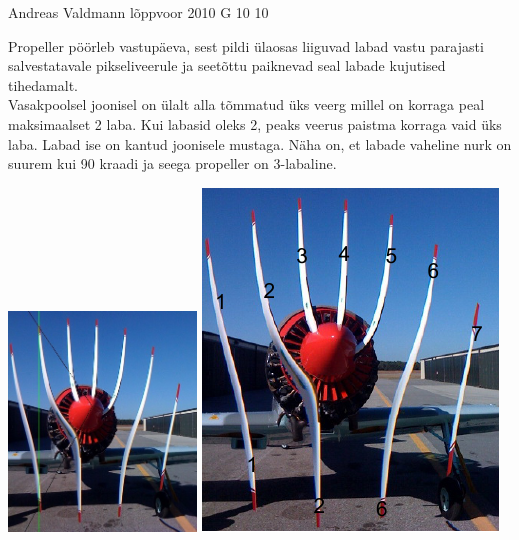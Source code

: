 \documentclass[11pt]{article}
\begin{document}
{%
{Andreas Valdmann} %
{lõppvoor} %
{2010} %
{G 10} %
{10} %
{

\ifSolution
\osa Propeller pöörleb vastupäeva, sest pildi ülaosas liiguvad labad vastu parajasti salvestatavale pikseliveerule ja seetõttu paiknevad seal labade kujutised tihedamalt.\\
\osa Vasakpoolsel joonisel on ülalt alla tõmmatud üks veerg millel on korraga peal maksimaalset 2 laba. Kui labasid oleks 2, peaks veerus paistma korraga vaid üks laba. Labad ise on kantud joonisele mustaga. Näha on, et labade vaheline nurk on suurem kui 90 kraadi ja seega propeller on 3-labaline.

\begin{center}
	\includegraphics[width=50mm]{2010-v3g-10-Propeller2.jpg}
	\qquad
	\includegraphics{2010-v3g-10-proplah}
\end{center}

}}
\end{document}
